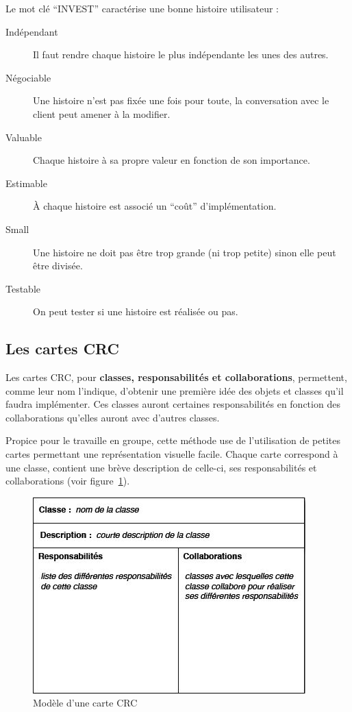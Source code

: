 Le mot clé ``INVEST'' caractérise une bonne histoire utilisateur :
\begin{description}
  \item[Indépendant] Il faut rendre chaque histoire
    le plus indépendante les unes des autres.
  \item[Négociable] Une histoire n'est pas fixée une fois pour
    toute, la conversation avec le client peut amener à la modifier.
  \item[Valuable] Chaque histoire à
    sa propre valeur en fonction de son importance.
  \item[Estimable] À chaque histoire est associé un
    ``coût'' d'implémentation.
  \item[Small]Une histoire ne doit pas
    être trop grande (ni trop petite) sinon elle peut être divisée.
  \item[Testable]On peut tester si une histoire est réalisée ou pas.
\end{description}

\subsection{Les cartes CRC}
Les cartes CRC, pour \textbf{classes, responsabilités et collaborations},
permettent, comme leur nom l'indique,
d'obtenir une première idée des objets et classes qu'il faudra implémenter.
Ces classes auront certaines responsabilités en fonction des collaborations
qu'elles auront avec d'autres classes.

Propice pour le travaille en groupe,
cette méthode use de l'utilisation de petites cartes
permettant une représentation visuelle facile.
Chaque carte correspond à une classe,
contient une brève description de celle-ci,
ses responsabilités et collaborations (voir figure~\ref{carte_CRC}).

\begin{figure}[h]
  \centering
  \includegraphics[scale=0.9]{carte_CRC.jpg}
  \caption{Modèle d'une carte CRC}
  \label{carte_CRC}
\end{figure}

